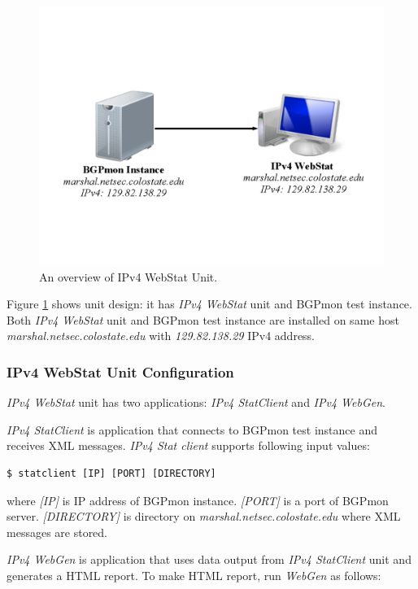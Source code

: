 \begin{figure}
\centering
\includegraphics[scale=0.30]{figs/ipv4-webstat.png}
\caption{An overview of IPv4 WebStat Unit.}
\label{webstat}
\end{figure}

Figure \ref{webstat} shows unit design: it has \emph{IPv4 WebStat} unit and BGPmon test instance. Both \emph{IPv4 WebStat} unit and BGPmon test instance are installed on same host \emph{marshal.netsec.colostate.edu} with \emph{129.82.138.29} IPv4 address. 

\subsubsection{IPv4 WebStat Unit Configuration}

\emph{IPv4 WebStat} unit has two applications: \emph{IPv4 StatClient} and \emph{IPv4 WebGen}. 

\emph{IPv4 StatClient} is application that connects to BGPmon test instance and receives XML messages.    \emph{IPv4 Stat client} supports following input values:

\begin{verbatim}
$ statclient [IP] [PORT] [DIRECTORY]
\end{verbatim}

where \emph{[IP]} is IP address of BGPmon instance. \emph{[PORT]} is a port of BGPmon server. \emph{[DIRECTORY]} is directory on \emph{marshal.netsec.colostate.edu} where XML messages are stored. 

\emph{IPv4 WebGen} is application that uses data output from \emph{IPv4 StatClient} unit and generates a HTML report. To make HTML report, run \emph{WebGen} as follows:

